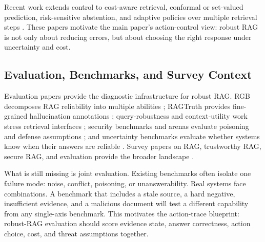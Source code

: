 Recent work extends control to cost-aware retrieval, conformal or set-valued prediction, risk-sensitive abstention, and adaptive policies over multiple retrieval steps \citep{rrag159,rrag164,rrag167,rrag169,rrag173,rrag178,rrag186,rrag191,rrag192,rrag198,rrag205,rrag228}. These papers motivate the main paper's action-control view: robust RAG is not only about reducing errors, but about choosing the right response under uncertainty and cost.

\subsection{Evaluation, Benchmarks, and Survey Context}

Evaluation papers provide the diagnostic infrastructure for robust RAG. RGB decomposes RAG reliability into multiple abilities \citep{rgb2023}; RAGTruth provides fine-grained hallucination annotations \citep{ragTruth2024}; query-robustness and context-utility work stress retrieval interfaces \citep{queryRobustness2025,rrag058}; security benchmarks and arenas evaluate poisoning and defense assumptions \citep{rrag019,rrag023,rrag035}; and uncertainty benchmarks evaluate whether systems know when their answers are reliable \citep{rrag001,rrag093}. Survey papers on RAG, trustworthy RAG, secure RAG, and evaluation provide the broader landscape \citep{ragSurvey2024,ragComprehensive2025,ragEvaluationSurvey2024,trustRAGCompass2024,trustworthyRAGSurvey2025,securityRAGSurvey2026,rrag134,rrag151}.

What is still missing is joint evaluation. Existing benchmarks often isolate one failure mode: noise, conflict, poisoning, or unanswerability. Real systems face combinations. A benchmark that includes a stale source, a hard negative, insufficient evidence, and a malicious document will test a different capability from any single-axis benchmark. This motivates the action-trace blueprint: robust-RAG evaluation should score evidence state, answer correctness, action choice, cost, and threat assumptions together.

